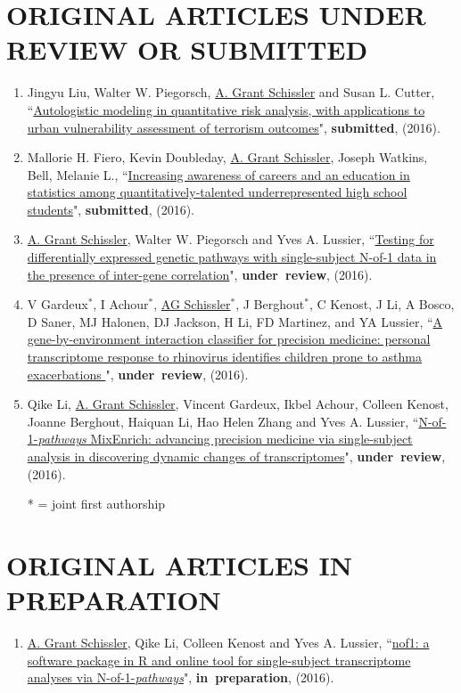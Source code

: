 \documentclass[paper=a4,fontsize=11pt]{scrartcl} %
\newcommand{\NewPart}[2]{\section*{\uppercase{#1} #2 }}
\newcommand{\PaperEntry}[7]{
		\noindent #1, ``\href{#7}{#2}", \textit{#3} \textbf{#4}, #5 (#6).}
\begin{document}
\NewPart{Original articles under review or submitted}{}
\vspace{-7pt}
\begin{enumerate}

\item \PaperEntry{Jingyu Liu, Walter W. Piegorsch, \underline{A. Grant Schissler} and Susan L. Cutter}{Autologistic modeling in quantitative risk analysis, with applications to urban vulnerability assessment of terrorism outcomes}{}{submitted}{}{2016}{}

\item \PaperEntry{Mallorie H. Fiero, Kevin Doubleday, \underline{A. Grant Schissler}, Joseph Watkins, Bell, Melanie L.}{Increasing awareness of careers and an education in statistics among quantitatively-talented underrepresented high school students}{}{submitted}{}{2016}{}

  \item \PaperEntry{\underline{A. Grant Schissler}, Walter W. Piegorsch and Yves A. Lussier}{Testing for differentially expressed genetic pathways with single-subject N-of-1 data in the presence of inter-gene correlation}{}{under~review}{}{2016}{}

  \item \PaperEntry{V Gardeux$^{*}$, I Achour$^{*}$, \underline{AG Schissler}$^{*}$, J Berghout$^{*}$, C Kenost, J Li, A Bosco, D Saner, MJ Halonen, DJ Jackson, H Li, FD Martinez, and YA Lussier}{A gene-by-environment interaction classifier for precision medicine: personal transcriptome response to rhinovirus identifies children prone to asthma exacerbations
}{}{under~review}{}{2016}{}

\item \PaperEntry{Qike Li, \underline{A. Grant Schissler}, Vincent Gardeux, Ikbel Achour, Colleen Kenost, Joanne Berghout, Haiquan Li, Hao Helen Zhang and Yves A. Lussier}{N-of-1-\emph{pathways} MixEnrich: advancing precision medicine via single-subject analysis in discovering dynamic changes of transcriptomes}{}{under~review}{}{2016}{}

    * = joint first authorship
\end{enumerate}


\NewPart{Original articles in preparation}{}
\vspace{-7pt}
\begin{enumerate}

\item \PaperEntry{\underline{A. Grant Schissler}, Qike Li, Colleen Kenost and Yves A. Lussier}{nof1: a software package in R and online tool for single-subject transcriptome analyses via N-of-1-\emph{pathways}}{}{in~preparation}{}{2016}{}

\end{enumerate}
\end{document}
